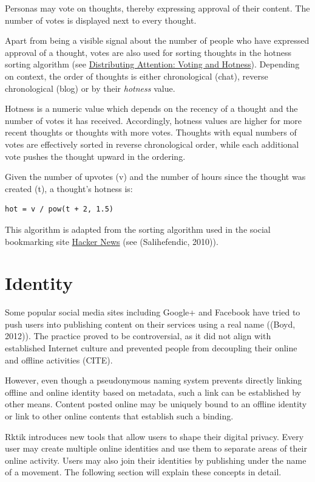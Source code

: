 Personas may vote on thoughts, thereby expressing approval of their
content. The number of votes is displayed next to every thought.

Apart from being a visible signal about the number of people who have
expressed approval of a thought, votes are also used for sorting
thoughts in the hotness sorting algorithm (see
\hyperref[hotness]{Distributing Attention: Voting and Hotness}).
Depending on context, the order of thoughts is either chronological
(chat), reverse chronological (blog) or by their \emph{hotness} value.

Hotness is a numeric value which depends on the recency of a thought and
the number of votes it has received. Accordingly, hotness values are
higher for more recent thoughts or thoughts with more votes. Thoughts
with equal numbers of votes are effectively sorted in reverse
chronological order, while each additional vote pushes the thought
upward in the ordering.

Given the number of upvotes (v) and the number of hours since the
thought was created (t), a thought's hotness is:

\begin{verbatim}
hot = v / pow(t + 2, 1.5)
\end{verbatim}

This algorithm is adapted from the sorting algorithm used in the social
bookmarking site \href{https://news.ycombinator.com/}{Hacker News} (see
(Salihefendic, 2010)).

\section{Identity}\label{identity}

Some popular social media sites including Google+ and Facebook have
tried to push users into publishing content on their services using a
real name ((Boyd, 2012)). The practice proved to be controversial, as it
did not align with established Internet culture and prevented people
from decoupling their online and offline activities (CITE).

However, even though a pseudonymous naming system prevents directly
linking offline and online identity based on metadata, such a link can
be established by other means. Content posted online may be uniquely
bound to an offline identity or link to other online contents that
establish such a binding.

Rktik introduces new tools that allow users to shape their digital
privacy. Every user may create multiple online identities and use them
to separate areas of their online activity. Users may also join their
identities by publishing under the name of a movement. The following
section will explain these concepts in detail.

